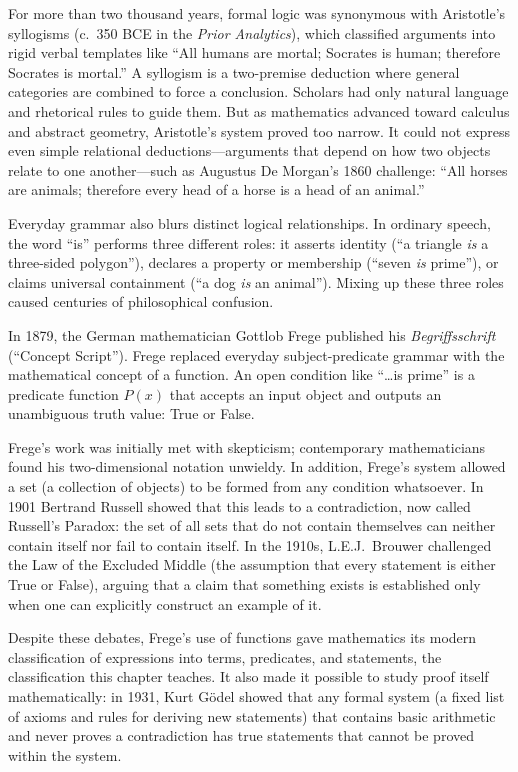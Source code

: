 \begin{historybox}
For more than two thousand years, formal logic was synonymous with Aristotle's syllogisms (c.~350 BCE in the \emph{Prior Analytics}), which classified arguments into rigid verbal templates like ``All humans are mortal; Socrates is human; therefore Socrates is mortal.'' A syllogism is a two-premise deduction where general categories are combined to force a conclusion. Scholars had only natural language and rhetorical rules to guide them. But as mathematics advanced toward calculus and abstract geometry, Aristotle's system proved too narrow. It could not express even simple relational deductions---arguments that depend on how two objects relate to one another---such as Augustus De Morgan's 1860 challenge: ``All horses are animals; therefore every head of a horse is a head of an animal.''

Everyday grammar also blurs distinct logical relationships. In ordinary speech, the word ``is'' performs three different roles: it asserts identity (``a triangle \emph{is} a three-sided polygon''), declares a property or membership (``seven \emph{is} prime''), or claims universal containment (``a dog \emph{is} an animal''). Mixing up these three roles caused centuries of philosophical confusion.

In 1879, the German mathematician Gottlob Frege published his \emph{Begriffsschrift} (``Concept Script''). Frege replaced everyday subject-predicate grammar with the mathematical concept of a function. An open condition like ``\ldots is prime'' is a predicate function $P(x)$ that accepts an input object and outputs an unambiguous truth value: True or False.

Frege's work was initially met with skepticism; contemporary mathematicians found his two-dimensional notation unwieldy. In addition, Frege's system allowed a set (a collection of objects) to be formed from any condition whatsoever. In 1901 Bertrand Russell showed that this leads to a contradiction, now called Russell's Paradox: the set of all sets that do not contain themselves can neither contain itself nor fail to contain itself. In the 1910s, L.E.J.~Brouwer challenged the Law of the Excluded Middle (the assumption that every statement is either True or False), arguing that a claim that something exists is established only when one can explicitly construct an example of it.

Despite these debates, Frege's use of functions gave mathematics its modern classification of expressions into terms, predicates, and statements, the classification this chapter teaches. It also made it possible to study proof itself mathematically: in 1931, Kurt G\"odel showed that any formal system (a fixed list of axioms and rules for deriving new statements) that contains basic arithmetic and never proves a contradiction has true statements that cannot be proved within the system.
\end{historybox}

